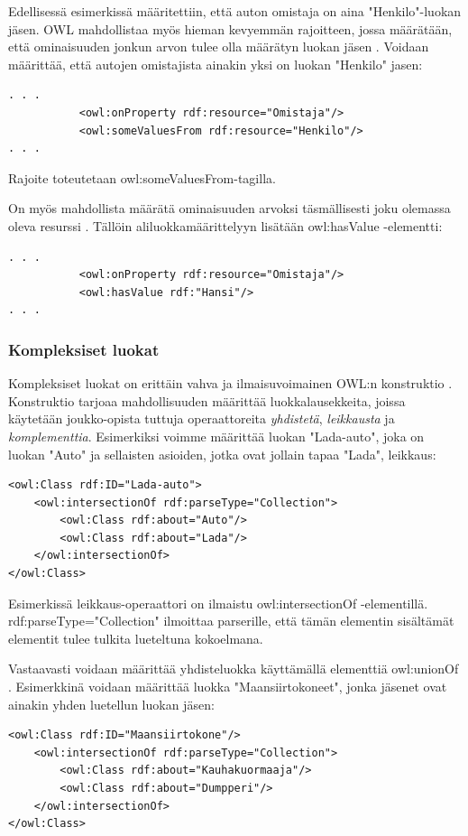 \documentclass[finnish]{tktltiki2}
\theoremstyle{definition}
\theoremstyle{remark}
\begin{document}
Edellisessä esimerkissä määritettiin, että auton omistaja on aina "Henkilo"-luokan jäsen. OWL mahdollistaa myös hieman kevyemmän rajoitteen, jossa määrätään, että ominaisuuden jonkun arvon tulee olla määrätyn luokan jäsen \cite{SWM04}. Voidaan määrittää, että autojen omistajista ainakin yksi on luokan "Henkilo" jasen:
\begin{verbatim}
. . .
           <owl:onProperty rdf:resource="Omistaja"/>
           <owl:someValuesFrom rdf:resource="Henkilo"/>
. . .
\end{verbatim}
Rajoite toteutetaan owl:someValuesFrom-tagilla.

On myös mahdollista määrätä ominaisuuden arvoksi täsmällisesti joku olemassa oleva resurssi \cite{SWM04}. Tällöin aliluokkamäärittelyyn lisätään owl:hasValue -elementti:
\begin{verbatim}
. . .
           <owl:onProperty rdf:resource="Omistaja"/>
           <owl:hasValue rdf:"Hansi"/>
. . .
\end{verbatim}

\subsubsection{Kompleksiset luokat}
Kompleksiset luokat on erittäin vahva ja ilmaisuvoimainen OWL:n konstruktio \cite{SWM04}. Konstruktio tarjoaa mahdollisuuden määrittää luokkalausekkeita, joissa käytetään joukko-opista tuttuja operaattoreita \textit{yhdistetä}, \textit{leikkausta} ja \textit{komplementtia}. Esimerkiksi voimme määrittää luokan "Lada-auto", joka on luokan "Auto" ja sellaisten asioiden, jotka ovat jollain tapaa "Lada", leikkaus:
\begin{verbatim}
<owl:Class rdf:ID="Lada-auto">
    <owl:intersectionOf rdf:parseType="Collection">
        <owl:Class rdf:about="Auto"/>
        <owl:Class rdf:about="Lada"/>
    </owl:intersectionOf>
</owl:Class>
\end{verbatim}

Esimerkissä leikkaus-operaattori on ilmaistu owl:intersectionOf -elementillä. rdf:parseType="Collection" ilmoittaa parserille, että tämän elementin sisältämät elementit tulee tulkita lueteltuna kokoelmana.

Vastaavasti voidaan määrittää yhdisteluokka käyttämällä elementtiä owl:unionOf \cite{SWM04}. Esimerkkinä voidaan määrittää luokka "Maansiirtokoneet", jonka jäsenet ovat ainakin yhden luetellun luokan jäsen:
\begin{verbatim}
<owl:Class rdf:ID="Maansiirtokone"/>
    <owl:intersectionOf rdf:parseType="Collection">
        <owl:Class rdf:about="Kauhakuormaaja"/>
        <owl:Class rdf:about="Dumpperi"/>
    </owl:intersectionOf>
</owl:Class>
\end{verbatim}
 
\end{document}
